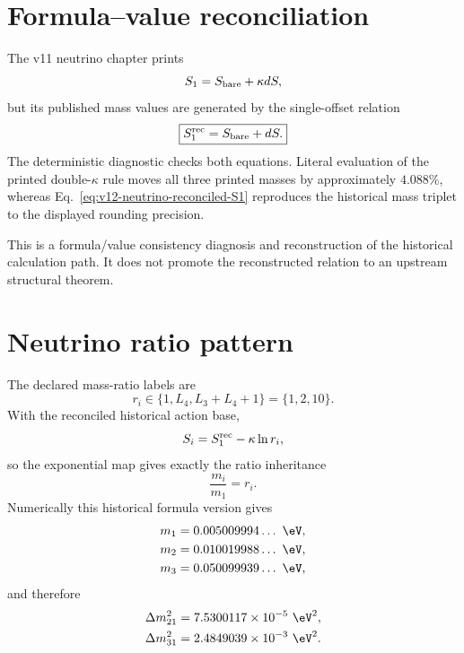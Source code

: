 \section{Formula--value reconciliation}
The v11 neutrino chapter prints
\[
S_1=S_{\rm bare}+\kappa dS,
\]
but its published mass values are generated by the single-offset relation
\begin{equation}
\boxed{
S_1^{\rm rec}=S_{\rm bare}+dS.
}
\label{eq:v12-neutrino-reconciled-S1}
\end{equation}
The deterministic diagnostic
checks both equations. Literal evaluation of the printed double-$\kappa$ rule
moves all three printed masses by approximately $4.088\%$, whereas
Eq.~\eqref{eq:v12-neutrino-reconciled-S1} reproduces the historical mass triplet
to the displayed rounding precision.

This is a formula/value consistency diagnosis and reconstruction of the
historical calculation path. It does not promote the reconstructed relation to
an upstream structural theorem.

\section{Neutrino ratio pattern}
The declared mass-ratio labels are
\begin{equation}
\boxed{
r_i\in\{1,L_4,L_3+L_4+1\}=\{1,2,10\}.
}
\label{eq:v12-neutrino-ratios}
\end{equation}
With the reconciled historical action base,
\begin{equation}
S_i=S_1^{\rm rec}-\kappa\ln r_i,
\label{eq:v12-neutrino-actions}
\end{equation}
so the exponential map gives exactly the ratio inheritance
\begin{equation}
\frac{m_i}{m_1}=r_i.
\label{eq:v12-neutrino-ratio-inheritance}
\end{equation}
Numerically this historical formula version gives
\begin{align}
m_1&=0.005009994\ldots\ \eV,\\
m_2&=0.010019988\ldots\ \eV,\\
m_3&=0.050099939\ldots\ \eV,
\end{align}
and therefore
\begin{align}
\Delta m_{21}^2
&=7.5300117\times10^{-5}\ \eV^2,\\
\Delta m_{31}^2
&=2.4849039\times10^{-3}\ \eV^2.
\end{align}

